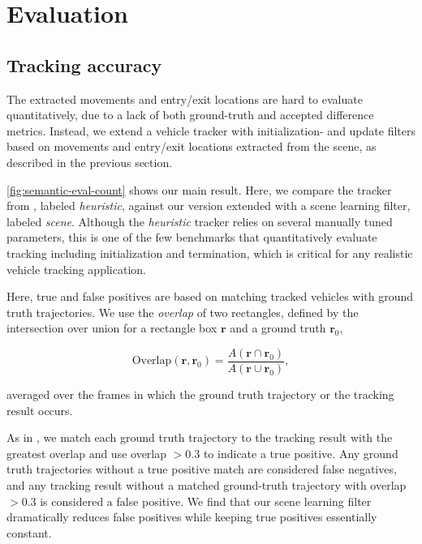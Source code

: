 \section{Evaluation}
\label{sec:semantic-eval}


\subsection{Tracking accuracy}

The extracted movements and entry/exit locations are hard to evaluate quantitatively, due to a lack of both ground-truth and accepted difference metrics.
Instead, we extend a vehicle tracker with initialization- and update filters based on movements and entry/exit locations extracted from the scene, as described in the previous section.



\ref{fig:semantic-eval-count} shows our main result. Here, we compare the tracker from \cite{yanziVehicleTracker}, labeled {\it heuristic}, against our version extended with a scene learning filter, labeled {\it scene}. 
Although the {\it heuristic} tracker relies on several manually tuned parameters, this is one of the few benchmarks that quantitatively evaluate tracking including initialization and termination, which is critical for any realistic vehicle tracking application.

Here, true and false positives are based on matching tracked vehicles with ground truth trajectories.
We use the {\it overlap} of two rectangles, defined by the intersection over union for a rectangle box $\bm{r}$ and a ground truth $\bm{r}_0$,

$$\text{Overlap}(\bm{r}, \bm{r}_0) = \frac{A(\bm{r} \cap \bm{r}_0)}{A(\bm{r} \cup \bm{r}_0)},$$

averaged over the frames in which the ground truth trajectory or the tracking result occurs. 

As in \cite{yanziVehicleTracker}, we match each ground truth trajectory to the tracking result with the greatest overlap and use overlap $> 0.3$ to indicate a true positive. 
Any ground truth trajectories without a true positive match are considered false negatives, and any tracking result without a matched ground-truth trajectory with overlap $> 0.3$ is considered a false positive.
We find that our scene learning filter dramatically reduces false positives while keeping true positives essentially constant. 

